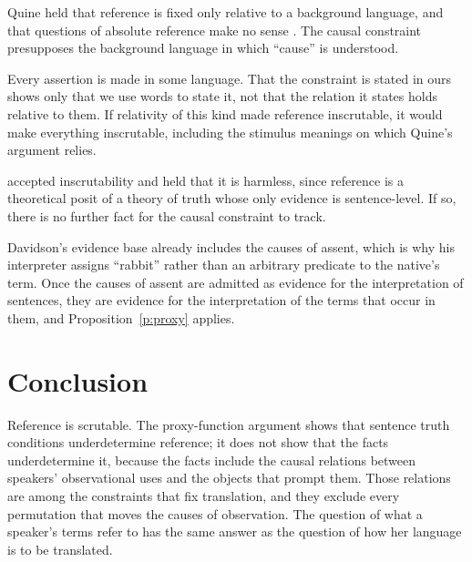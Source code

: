 \documentclass{situationist-preprint}
\begin{document}
\begin{objection}
Quine held that reference is fixed only relative to a background language, and that questions of absolute reference make no sense \citep{Quine1968}. The causal constraint presupposes the background language in which \enquote{cause} is understood.
\end{objection}

\begin{reply}
Every assertion is made in some language. That the constraint is stated in ours shows only that we use words to state it, not that the relation it states holds relative to them. If relativity of this kind made reference inscrutable, it would make everything inscrutable, including the stimulus meanings on which Quine's argument relies.
\end{reply}

\begin{objection}
\citet{Davidson1979} accepted inscrutability and held that it is harmless, since reference is a theoretical posit of a theory of truth whose only evidence is sentence-level. If so, there is no further fact for the causal constraint to track.
\end{objection}

\begin{reply}
Davidson's evidence base already includes the causes of assent, which is why his interpreter assigns \enquote{rabbit} rather than an arbitrary predicate to the native's term. Once the causes of assent are admitted as evidence for the interpretation of sentences, they are evidence for the interpretation of the terms that occur in them, and Proposition~\ref{p:proxy} applies.
\end{reply}

\section{Conclusion}

Reference is scrutable. The proxy-function argument shows that sentence truth conditions underdetermine reference; it does not show that the facts underdetermine it, because the facts include the causal relations between speakers' observational uses and the objects that prompt them. Those relations are among the constraints that fix translation, and they exclude every permutation that moves the causes of observation. The question of what a speaker's terms refer to has the same answer as the question of how her language is to be translated.
\end{document}
